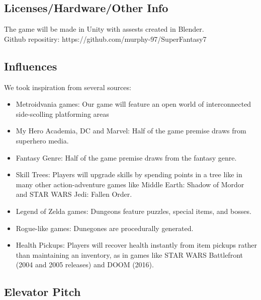 \documentclass[titlepage]{article}
\begin{document}
\subsection*{Licenses/Hardware/Other Info}
The game will be made in Unity with assests created in Blender.  \\

Github repositiry: https://github.com/murphy-97/SuperFantasy7

\subsection*{Influences}
We took inspiration from several sources:

\begin{itemize}
    \item Metroidvania games: Our game will feature an open world of
    interconnected side-scolling platforming areas
    \item My Hero Academia, DC and Marvel: Half of the game premise draws from
    superhero media.
    \item Fantasy Genre: Half of the game premise draws from the fantasy genre.
    \item Skill Trees: Players will upgrade skills by spending points in a tree
    like in many other action-adventure games like Middle Earth: Shadow of
    Mordor and STAR WARS Jedi: Fallen Order.
    \item Legend of Zelda games: Dungeons feature puzzles, special items, and
    bosses.
    \item Rogue-like games: Dunegones are procedurally generated.
    \item Health Pickups: Players will recover health instantly from item
    pickups rather than maintaining an inventory, as in games like STAR WARS
    Battlefront (2004 and 2005 releases) and DOOM (2016). 
\end{itemize}

\subsection*{Elevator Pitch}

%
\end{document}
